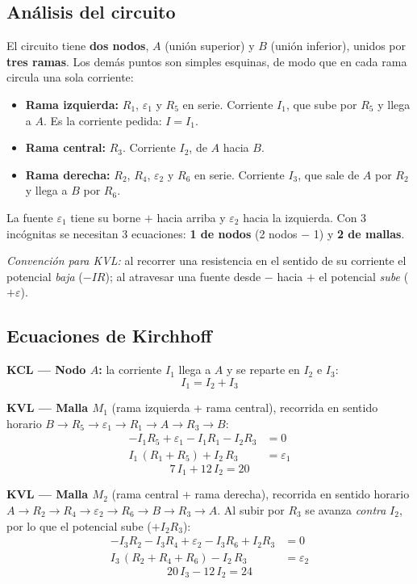 \documentclass[12pt,letterpaper]{article}
\begin{document}
\subsection*{An\'alisis del circuito}

El circuito tiene \textbf{dos nodos}, $A$ (uni\'on superior) y $B$ (uni\'on inferior), unidos
por \textbf{tres ramas}. Los dem\'as puntos son simples esquinas, de modo que en cada rama
circula una sola corriente:
\begin{itemize}\setlength\itemsep{1pt}
    \item \textbf{Rama izquierda:} $R_1$, $\varepsilon_1$ y $R_5$ en serie. Corriente $I_1$, que
          sube por $R_5$ y llega a $A$. Es la corriente pedida: $I = I_1$.
    \item \textbf{Rama central:} $R_3$. Corriente $I_2$, de $A$ hacia $B$.
    \item \textbf{Rama derecha:} $R_2$, $R_4$, $\varepsilon_2$ y $R_6$ en serie. Corriente $I_3$,
          que sale de $A$ por $R_2$ y llega a $B$ por $R_6$.
\end{itemize}
La fuente $\varepsilon_1$ tiene su borne $+$ hacia arriba y $\varepsilon_2$ hacia la izquierda.
Con 3 inc\'ognitas se necesitan 3 ecuaciones: \textbf{1 de nodos} (2 nodos $-$ 1) y
\textbf{2 de mallas}.

\medskip
\noindent\textit{Convenci\'on para KVL:} al recorrer una resistencia en el sentido de su
corriente el potencial \emph{baja} ($-IR$); al atravesar una fuente desde $-$ hacia $+$ el
potencial \emph{sube} ($+\varepsilon$).

\subsection*{Ecuaciones de Kirchhoff}

\textbf{KCL --- Nodo $A$:} la corriente $I_1$ llega a $A$ y se reparte en $I_2$ e $I_3$:
\[
    \boxed{I_1 = I_2 + I_3} \tag{N}
\]

\textbf{KVL --- Malla $M_1$} (rama izquierda + rama central), recorrida en sentido horario
$B\to R_5\to\varepsilon_1\to R_1\to A\to R_3\to B$:
\begin{align*}
    -I_1R_5 + \varepsilon_1 - I_1R_1 - I_2R_3 &= 0\\[2pt]
    I_1\,(R_1+R_5) + I_2\,R_3 &= \varepsilon_1
\end{align*}
\[
    \boxed{7\,I_1 + 12\,I_2 = 20} \tag{M1}
\]

\textbf{KVL --- Malla $M_2$} (rama central + rama derecha), recorrida en sentido horario
$A\to R_2\to R_4\to\varepsilon_2\to R_6\to B\to R_3\to A$. Al subir por $R_3$ se avanza
\emph{contra} $I_2$, por lo que el potencial sube ($+I_2R_3$):
\begin{align*}
    -I_3R_2 - I_3R_4 + \varepsilon_2 - I_3R_6 + I_2R_3 &= 0\\[2pt]
    I_3\,(R_2+R_4+R_6) - I_2\,R_3 &= \varepsilon_2
\end{align*}
\[
    \boxed{20\,I_3 - 12\,I_2 = 24} \tag{M2}
\]
\end{document}
